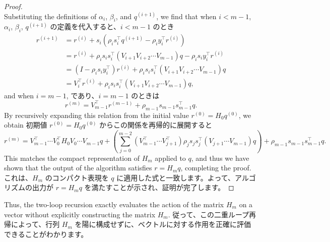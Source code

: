 \documentclass[0_main]{subfiles}
\begin{document}
\begin{proof}
\begin{equation*}
    \end{equation*}
    \ifEn
        Substituting the definitions of $\alpha_i$, $\beta_i$, and $q^{(i+1)}$, we find that when $i < m-1$,
    \else
        $\alpha_i$, $\beta_i$, $q^{(i+1)}$ の定義を代入すると、$i < m-1$ のとき
    \fi
    \begin{align*}
        r^{(i+1)}
         & = r^{(i)} + s_i \left(\rho_i s_i^\top q^{(i+1)} - \rho_i y_i^\top r^{(i)}\right)                                  \\
         & = r^{(i)} + \rho_i s_i s_i^\top \left(V_{i+1} V_{i+2} \cdots V_{m-1}\right) q - \rho_i s_i y_i^\top r^{(i)}       \\
         & = \left(I- \rho_i s_i y_i^\top\right) r^{(i)} + \rho_i s_i s_i^\top \left(V_{i+1} V_{i+2} \cdots V_{m-1}\right) q \\
         & =
        V_i^\top r^{(i)}
        +
        \rho_i s_i s_i^\top
        \left(V_{i+1} V_{i+2} \cdots V_{m-1}\right) q,
    \end{align*}
    \ifEn
        and when $i = m-1$,
    \else
        であり、$i = m-1$ のときは
    \fi
    \begin{equation*}
        r^{(m)} = V_{m-1}^\top r^{(m-1)} + \rho_{m-1} s_{m-1} s_{m-1}^\top q.
    \end{equation*}
    \ifEn
        By recursively expanding this relation from the initial value $r^{(0)} = H_0 q^{(0)}$, we obtain
    \else
        初期値 $r^{(0)} = H_0 q^{(0)}$ からこの関係を再帰的に展開すると
    \fi
    \begin{equation*}
        r^{(m)} = V_{m-1}^\top \cdots V_0^\top H_0 V_0 \cdots V_{m-1} q + \left(\sum_{j=0}^{m-2} (V_{m-1}^\top \cdots V_{j+1}^\top) \rho_j s_j s_j^\top (V_{j+1} \cdots V_{m-1}) q\right) + \rho_{m-1} s_{m-1} s_{m-1}^\top q.
    \end{equation*}
    \ifEn
        This matches the compact representation of $H_m$ applied to $q$, and thus we have shown that the output of the algorithm satisfies $r = H_m q$, completing the proof.
    \else
        これは、$H_m$ のコンパクト表現を $q$ に適用した式と一致します。よって、アルゴリズムの出力が $r = H_m q$ を満たすことが示され、証明が完了します。
    \fi
    \myQED
\end{proof}

\ifEn
    Thus, the two-loop recursion exactly evaluates the action of the matrix $H_m$ on a vector without explicitly constructing the matrix $H_m$.
\else
    従って、この二重ループ再帰によって、行列 $H_m$ を陽に構成せずに、ベクトルに対する作用を正確に評価できることがわかります。
\fi
\end{document}
